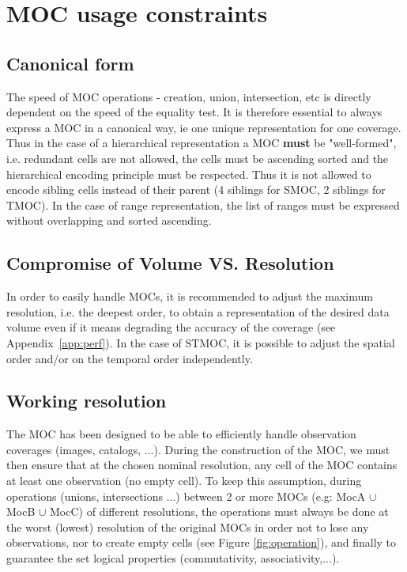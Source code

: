 \documentclass[11pt,a4paper]{ivoa}
\begin{document}
\section{MOC usage constraints}

\subsection{Canonical form}
\label{sec:can}
The speed of MOC operations - creation, union, intersection, etc
is directly dependent on the speed of the equality test. It is
therefore essential to always express a MOC in a canonical way, ie
one unique representation for one coverage. Thus in the case of a
hierarchical representation a MOC \textbf{must} be "well-formed", i.e. 
redundant cells are not allowed, the cells must be ascending sorted
and the hierarchical encoding principle must be respected. Thus it
is not allowed to encode sibling cells instead of their parent (4
siblings for SMOC, 2 siblings for TMOC). In the case of range
representation, the list of ranges must be expressed without
overlapping and sorted ascending.


\subsection{Compromise of Volume VS. Resolution}
In order to easily handle MOCs, it is recommended to adjust
the maximum resolution, i.e. the deepest order, to obtain a representation of
the desired data volume even if it means degrading the accuracy of the coverage
(see Appendix~\ref{app:perf}). In the case of STMOC, it is possible to adjust
the spatial order and/or on the temporal order independently.

\subsection{Working resolution}
The MOC has been designed to be able to efficiently handle observation
coverages (images, catalogs, ...). During the construction of the
MOC, we must then ensure that at the chosen nominal resolution, any cell
of the MOC contains at least one observation (no empty cell). To keep
this assumption, during operations (unions, intersections ...)
between 2 or more MOCs (e.g: MocA $\cup$ MocB $\cup$ MocC) of different
resolutions, the operations
must always be done at the worst (lowest) resolution of the original MOCs
in order not to lose any observations, nor to create empty cells (see
Figure \ref{fig:operation}), and finally to guarantee the set logical
properties (commutativity, associativity,...).
\end{document}

